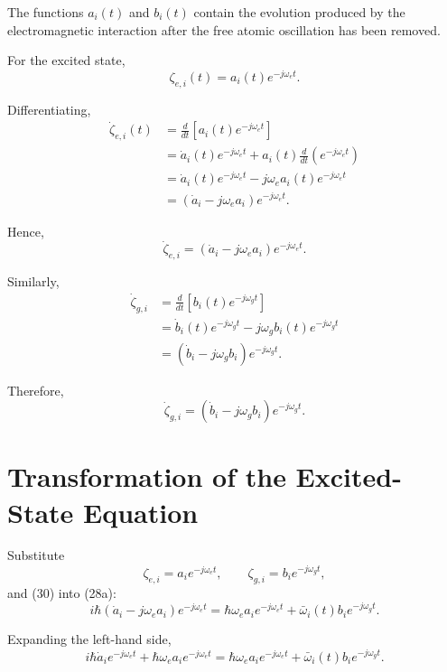 \documentclass[12pt,a4paper]{article}
\begin{document}
The functions \(a_i(t)\) and \(b_i(t)\) contain the evolution
produced by the electromagnetic interaction after the free atomic
oscillation has been removed.

For the excited state,
\[
\zeta_{e,i}(t)
=
a_i(t)e^{-j\omega_e t}.
\]

Differentiating,
\[
\begin{aligned}
\dot{\zeta}_{e,i}(t)
&=
\frac{d}{dt}
\left[
a_i(t)e^{-j\omega_e t}
\right]\\
&=
\dot a_i(t)e^{-j\omega_e t}
+
a_i(t)
\frac{d}{dt}
\left(
e^{-j\omega_e t}
\right)\\
&=
\dot a_i(t)e^{-j\omega_e t}
-
j\omega_ea_i(t)e^{-j\omega_e t}\\
&=
\left(
\dot a_i-j\omega_ea_i
\right)
e^{-j\omega_e t}.
\end{aligned}
\]

Hence,
\begin{equation}
\boxed{
\dot{\zeta}_{e,i}
=
\left(
\dot a_i-j\omega_ea_i
\right)
e^{-j\omega_e t}.
}
\tag{30}
\end{equation}

Similarly,
\[
\begin{aligned}
\dot{\zeta}_{g,i}
&=
\frac{d}{dt}
\left[
b_i(t)e^{-j\omega_g t}
\right]\\
&=
\dot b_i(t)e^{-j\omega_g t}
-
j\omega_gb_i(t)e^{-j\omega_g t}\\
&=
\left(
\dot b_i-j\omega_gb_i
\right)
e^{-j\omega_g t}.
\end{aligned}
\]

Therefore,
\begin{equation}
\boxed{
\dot{\zeta}_{g,i}
=
\left(
\dot b_i-j\omega_gb_i
\right)
e^{-j\omega_g t}.
}
\tag{31}
\end{equation}

\section{Transformation of the Excited-State Equation}

Substitute
\[
\zeta_{e,i}
=
a_i e^{-j\omega_e t},
\qquad
\zeta_{g,i}
=
b_i e^{-j\omega_g t},
\]
and (30) into (28a):
\[
i\hbar
\left(
\dot a_i-j\omega_ea_i
\right)
e^{-j\omega_e t}
=
\hbar\omega_e
a_i e^{-j\omega_e t}
+
\bar{\omega}_i(t)
b_i e^{-j\omega_g t}.
\]

Expanding the left-hand side,
\[
i\hbar\dot a_i e^{-j\omega_e t}
+
\hbar\omega_ea_i e^{-j\omega_e t}
=
\hbar\omega_ea_i e^{-j\omega_e t}
+
\bar{\omega}_i(t)b_i e^{-j\omega_g t}.
\]
\end{document}
